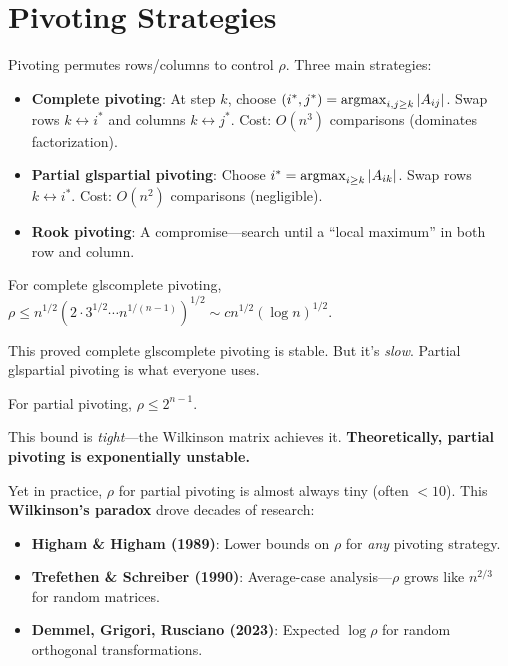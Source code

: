 \section{Pivoting Strategies}
\label{sec:ge:pivoting}

Pivoting permutes rows/columns to control $\rho$. Three main strategies:

\begin{itemize}
    \item \textbf{Complete pivoting}: At step $k$, choose $(i^*,j^*) = \operatorname{argmax}_{i,j\ge k} |A_{ij}|$. Swap rows $k \leftrightarrow i^*$ and columns $k \leftrightarrow j^*$. Cost: $O(n^3)$ comparisons (dominates factorization).
    \item \textbf{Partial gls{partial pivoting}}: Choose $i^* = \operatorname{argmax}_{i\ge k} |A_{ik}|$. Swap rows $k \leftrightarrow i^*$. Cost: $O(n^2)$ comparisons (negligible).
    \item \textbf{Rook pivoting}: A compromise---search until a ``local maximum'' in both row and column.
\end{itemize}

\begin{theorem} \cite{urschel2025numerical}
\label{thm:wilkinson:complete}
For complete gls{complete pivoting}, $\rho \le n^{1/2} (2 \cdot 3^{1/2} \cdots n^{1/(n-1)})^{1/2} \sim c n^{1/2} (\log n)^{1/2}$.
\end{theorem}

This proved complete gls{complete pivoting} is stable. But it's \emph{slow}. Partial gls{partial pivoting} is what everyone uses.

\begin{theorem} \cite{urschel2025numerical}
\label{thm:wilkinson:partial}
For partial pivoting, $\rho \le 2^{n-1}$.
\end{theorem}

This bound is \emph{tight}---the Wilkinson matrix achieves it. \textbf{Theoretically, partial pivoting is exponentially unstable.} \cite{urschel2025numerical}

Yet in practice, $\rho$ for partial pivoting is almost always tiny (often $< 10$). This \textbf{Wilkinson's paradox} drove decades of research: \cite{urschel2025numerical}

\begin{itemize}
    \item \textbf{Higham \& Higham (1989)}: Lower bounds on $\rho$ for \emph{any} pivoting strategy.
    \item \textbf{Trefethen \& Schreiber (1990)}: Average-case analysis---$\rho$ grows like $n^{2/3}$ for random matrices.
    \item \textbf{Demmel, Grigori, Rusciano (2023)}: Expected $\log \rho$ for random orthogonal transformations.
\end{itemize}

